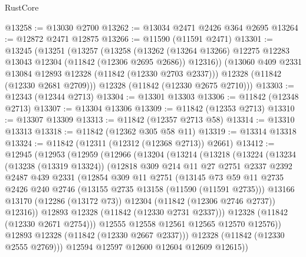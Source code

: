 \begin{lexlean}{RustCore}
\begin{coremodule}
@13258 := @13030 @2700
@13262 := @13034 @2471 @2426 @364 @2695
@13264 := @12872 @2471 @12875
@13266 := @11590 (@11591 @2471)
@13301 := @13245
    (@13251
      (@13257
        (@13258
          (@13262 (@13264 @13266) @12275 @12283 @13043 @12304 (@11842 (@12306 @2695 @2686)) @12316))
        (@13060 @409 @2331 @13084 @12893 @12328 (@11842 (@12330 @2703 @2337)))
        @12328
        (@11842 (@12330 @2681 @2709)))
      @12328
      (@11842 (@12330 @2675 @2710)))
@13303 := @12343 (@12344 @2713)
@13304 := @13301 @13303
@13306 := @11842 (@12348 @2713)
@13307 := @13304 @13306
@13309 := @11842 (@12353 @2713)
@13310 := @13307 @13309
@13313 := @11842 (@12357 @2713 @58)
@13314 := @13310 @13313
@13318 := @11842 (@12362 @305 @58 @11)
@13319 := @13314 @13318
@13324 := @11842 (@12311 (@12312 (@12368 @2713)) @2661)
@13412 := @12945
    (@12953
      (@12959
        (@12966
          (@13204
            (@13214
              (@13218
                (@13224
                  (@13234
                    (@13238 (@13319 @13324))
                    (@12818
                      @309
                      @214
                      @11
                      @27
                      @2751
                      @2337
                      @2392
                      @2487
                      @439
                      @2331
                      (@12854
                        @309
                        @11
                        @2751
                        (@13145
                          @73
                          @59
                          @11
                          @2735
                          @2426
                          @240
                          @2746
                          (@13155 @2735 @13158 (@11590 (@11591 @2735)))
                          @13166
                          @13170
                          (@12286 (@13172 @73))
                          @12304
                          (@11842 (@12306 @2746 @2737))
                          @12316))
                      @12893
                      @12328
                      (@11842 (@12330 @2731 @2337)))
                    @12328
                    (@11842 (@12330 @2671 @2754)))
                  @12555
                  @12558
                  @12561
                  @12565
                  @12570
                  @12576))
              @12893
              @12328
              (@11842 (@12330 @2667 @2337)))
            @12328
            (@11842 (@12330 @2555 @2769)))
          @12594
          @12597
          @12600
          @12604
          @12609
          @12615))

\end{coremodule}
\end{lexlean}
